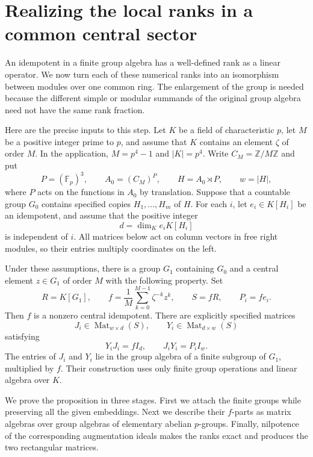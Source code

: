 \section{Realizing the local ranks in a common central sector}
\label{sec:sector}

An idempotent in a finite group algebra has a well-defined rank as a
linear operator.  We now turn each of these numerical ranks into an
isomorphism between modules over one common ring.  The enlargement of the
group is needed because the different simple or modular summands of the
original group algebra need not have the same rank fraction.

Here are the precise inputs to this step.  Let $K$ be a field of
characteristic $p$, let $M$ be a positive integer prime to $p$, and assume
that $K$ contains an element $\zeta$ of order $M$.  In the application,
$M=p^4-1$ and $|K|=p^4$. Write $C_M=\mathbb Z/M\mathbb Z$ and put
\[
 P=(\mathbb F_p)^3,\qquad A_0=(C_M)^P,\qquad
 H=A_0\rtimes P,\qquad w=|H|,
\]
where $P$ acts on the functions in $A_0$ by translation. Suppose that a
countable group $G_0$ contains specified copies $H_1,\ldots,H_m$ of $H$.
For each $i$, let $e_i\in K[H_i]$ be an idempotent, and assume that the
positive integer
\[
 d=\dim_K e_iK[H_i]
\]
is independent of $i$.  All matrices below act on column vectors in
free right modules, so their entries multiply coordinates on the left.

\begin{proposition}\label{prop:sector-ranks}
Under these assumptions, there is a group $G_1$ containing $G_0$ and a
central element $z\in G_1$ of order $M$ with the following property.  Set
\[
 R=K[G_1],\qquad
 f=\frac1M\sum_{k=0}^{M-1}\zeta^{-k}z^k,\qquad
 S=fR,\qquad P_i=fe_i.
\]
Then $f$ is a nonzero central idempotent.  There are explicitly
specified matrices
\[
 J_i\in\operatorname{Mat}_{w\times d}(S),\qquad
 Y_i\in\operatorname{Mat}_{d\times w}(S)
\]
satisfying
\begin{equation}\label{eq:sector-rectangular}
 Y_iJ_i=fI_d,\qquad J_iY_i=P_iI_w.
\end{equation}
The entries of $J_i$ and $Y_i$ lie in the group algebra of a finite
subgroup of $G_1$, multiplied by $f$.  Their construction uses only
finite group operations and linear algebra over $K$.
\end{proposition}

We prove the proposition in three stages.  First we attach the finite
groups while preserving all the given embeddings.  Next we describe
their $f$-parts as matrix algebras over group algebras of elementary
abelian $p$-groups.  Finally, nilpotence of the corresponding
augmentation ideals makes the ranks exact and produces the two
rectangular matrices.

